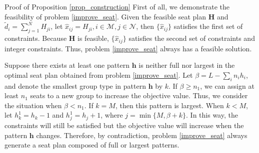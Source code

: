 \begin{pf}{Proof of Proposition \ref{prop_construction}}
  First of all, we demonstrate the feasibility of problem \eqref{improve_seat}. Given the feasible seat plan $\bm{H}$ and $\tilde{d}_{i} = \sum_{j=1}^{N} H_{ji}$, let $\hat{x}_{ij} = H_{ji}, i \in \mathcal{M}, j \in \mathcal{N}$, then $\{\hat{x}_{ij}\}$ satisfies the first set of constraints. Because $\bm{H}$ is feasible, $\{\hat{x}_{ij}\}$ satisfies the second set of constraints and integer constraints. Thus, problem \eqref{improve_seat} always has a feasible solution. 
  
  Suppose there exists at least one pattern $\bm{h}$ is neither full nor largest in the optimal seat plan obtained from problem \eqref{improve_seat}. Let $\beta = L - \sum_{i} n_{i} h_{i}$, and denote the smallest group type in pattern $\bm{h}$ by $k$. If $\beta \geq n_1$, we can assign at least $n_1$ seats to a new group to increase the objective value. Thus, we consider the situation when $\beta < n_1$. If $k =M$, then this pattern is largest. When $k< M$, let $h^{1}_{k} = h_{k} -1$ and $h^{1}_{j} = h_{j} +1$, where $j = \min\{M, \beta + k\}$. In this way, the constraints will still be satisfied but the objective value will increase when the pattern $\bm{h}$ changes. Therefore, by contradiction, problem \eqref{improve_seat} always generate a seat plan composed of full or largest patterns.
\end{pf}


